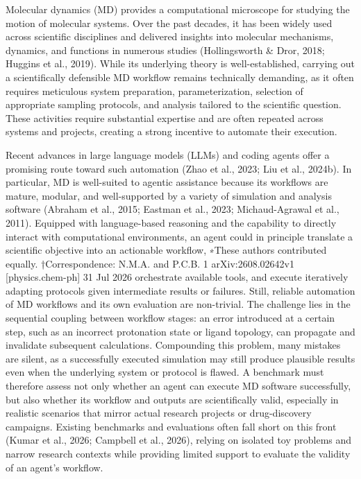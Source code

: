 Molecular dynamics (MD) provides a computational microscope for studying the motion of molecular
systems. Over the past decades, it has been widely used across scientific disciplines and delivered
insights into molecular mechanisms, dynamics, and functions in numerous studies (Hollingsworth &
Dror, 2018; Huggins et al., 2019). While its underlying theory is well-established, carrying out a
scientifically defensible MD workflow remains technically demanding, as it often requires meticulous
system preparation, parameterization, selection of appropriate sampling protocols, and analysis
tailored to the scientific question. These activities require substantial expertise and are often repeated
across systems and projects, creating a strong incentive to automate their execution.

Recent advances in large language models (LLMs) and coding agents offer a promising route toward
such automation (Zhao et al., 2023; Liu et al., 2024b). In particular, MD is well-suited to agentic
assistance because its workflows are mature, modular, and well-supported by a variety of simulation
and analysis software (Abraham et al., 2015; Eastman et al., 2023; Michaud-Agrawal et al., 2011).
Equipped with language-based reasoning and the capability to directly interact with computational
environments, an agent could in principle translate a scientific objective into an actionable workflow,
∗These authors contributed equally.
†Correspondence: N.M.A. and P.C.B.
1
arXiv:2608.02642v1 [physics.chem-ph] 31 Jul 2026
orchestrate available tools, and execute iteratively adapting protocols given intermediate results
or failures. Still, reliable automation of MD workflows and its own evaluation are non-trivial.
The challenge lies in the sequential coupling between workflow stages: an error introduced at a
certain step, such as an incorrect protonation state or ligand topology, can propagate and invalidate
subsequent calculations. Compounding this problem, many mistakes are silent, as a successfully
executed simulation may still produce plausible results even when the underlying system or protocol
is flawed. A benchmark must therefore assess not only whether an agent can execute MD software
successfully, but also whether its workflow and outputs are scientifically valid, especially in realistic
scenarios that mirror actual research projects or drug-discovery campaigns. Existing benchmarks
and evaluations often fall short on this front (Kumar et al., 2026; Campbell et al., 2026), relying on
isolated toy problems and narrow research contexts while providing limited support to evaluate the
validity of an agent’s workflow.

